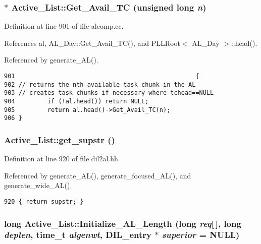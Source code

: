 \subsubsection{ $\ast$ Active\_\-List::Get\_\-Avail\_\-TC (unsigned long {\em n})}\label{classActive__List_a11}




Definition at line 901 of file alcomp.cc.

References al, AL\_\-Day::Get\_\-Avail\_\-TC(), and PLLRoot$<$ AL\_\-Day $>$::head().

Referenced by generate\_\-AL().



\footnotesize\begin{verbatim}901                                                  {
902 // returns the nth available task chunk in the AL
903 // creates task chunks if necessary where tchead==NULL
904         if (!al.head()) return NULL;
905         return al.head()->Get_Avail_TC(n);
906 }
\end{verbatim}\normalsize 
{}
\subsubsection{ Active\_\-List::get\_\-supstr ()\hspace{0.3cm}{\tt  [inline]}}\label{classActive__List_a1}




Definition at line 920 of file dil2al.hh.

Referenced by generate\_\-AL(), generate\_\-focused\_\-AL(), and generate\_\-wide\_\-AL().



\footnotesize\begin{verbatim}920 { return supstr; }
\end{verbatim}\normalsize 
{}
\subsubsection{\setlength{\rightskip}{0pt plus 5cm}long Active\_\-List::Initialize\_\-AL\_\-Length (long {\em req}[$\,$], long {\em deplen}, time\_\-t {\em algenwt}, {\bf DIL\_\-entry} $\ast$ {\em superior} = NULL)\hspace{0.3cm}{\tt  [protected]}}\label{classActive__List_b0}





